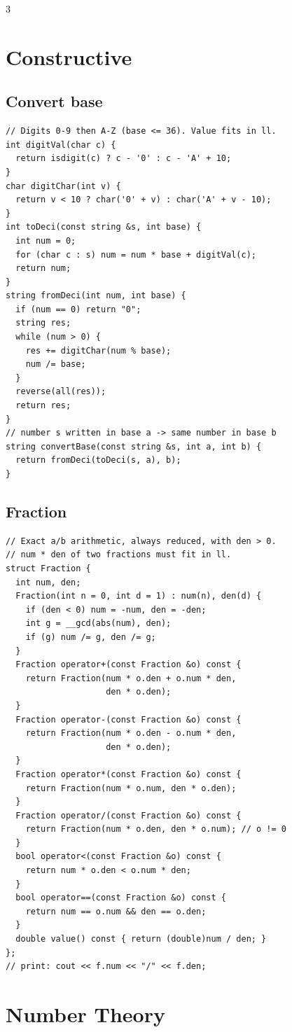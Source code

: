 \documentclass[8pt, a4paper]{article}
\begin{document}
\begin{multicols*}{3}
\section{Constructive}
\subsection{Convert base}
\begin{lstlisting}
// Digits 0-9 then A-Z (base <= 36). Value fits in ll.
int digitVal(char c) {
  return isdigit(c) ? c - '0' : c - 'A' + 10;
}
char digitChar(int v) {
  return v < 10 ? char('0' + v) : char('A' + v - 10);
}
int toDeci(const string &s, int base) {
  int num = 0;
  for (char c : s) num = num * base + digitVal(c);
  return num;
}
string fromDeci(int num, int base) {
  if (num == 0) return "0";
  string res;
  while (num > 0) {
    res += digitChar(num % base);
    num /= base;
  }
  reverse(all(res));
  return res;
}
// number s written in base a -> same number in base b
string convertBase(const string &s, int a, int b) {
  return fromDeci(toDeci(s, a), b);
}
\end{lstlisting}
\subsection{Fraction}
\begin{lstlisting}
// Exact a/b arithmetic, always reduced, with den > 0.
// num * den of two fractions must fit in ll.
struct Fraction {
  int num, den;
  Fraction(int n = 0, int d = 1) : num(n), den(d) {
    if (den < 0) num = -num, den = -den;
    int g = __gcd(abs(num), den);
    if (g) num /= g, den /= g;
  }
  Fraction operator+(const Fraction &o) const {
    return Fraction(num * o.den + o.num * den,
                    den * o.den);
  }
  Fraction operator-(const Fraction &o) const {
    return Fraction(num * o.den - o.num * den,
                    den * o.den);
  }
  Fraction operator*(const Fraction &o) const {
    return Fraction(num * o.num, den * o.den);
  }
  Fraction operator/(const Fraction &o) const {
    return Fraction(num * o.den, den * o.num); // o != 0
  }
  bool operator<(const Fraction &o) const {
    return num * o.den < o.num * den;
  }
  bool operator==(const Fraction &o) const {
    return num == o.num && den == o.den;
  }
  double value() const { return (double)num / den; }
};
// print: cout << f.num << "/" << f.den;
\end{lstlisting}
\section{Number Theory}

\end{multicols*}
\end{document}
